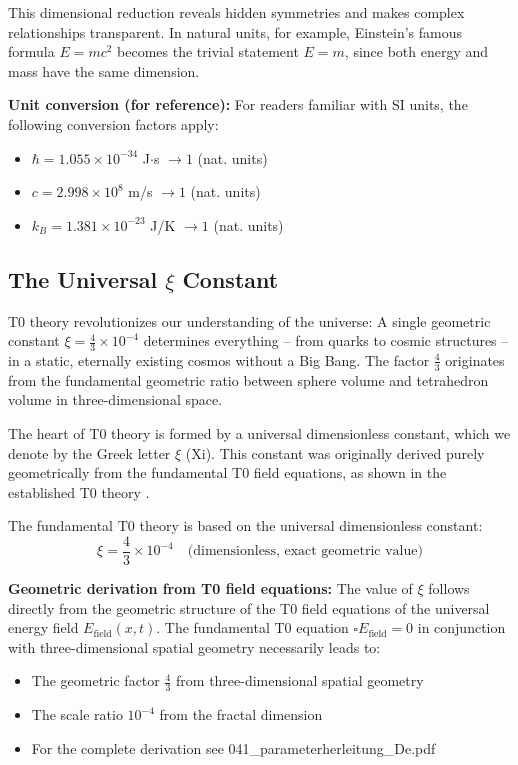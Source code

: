 	This dimensional reduction reveals hidden symmetries and makes complex relationships transparent. In natural units, for example, Einstein's famous formula $E = mc^2$ becomes the trivial statement $E = m$, since both energy and mass have the same dimension.
	
	\textbf{Unit conversion (for reference):}
	For readers familiar with SI units, the following conversion factors apply:
	\begin{itemize}
		\item $\hbar = 1.055 \times 10^{-34}$ J$\cdot$s $\rightarrow 1$ (nat. units)
		\item $c = 2.998 \times 10^8$ m/s $\rightarrow 1$ (nat. units)  
		\item $k_B = 1.381 \times 10^{-23}$ J/K $\rightarrow 1$ (nat. units)
	\end{itemize}
	
	\subsection{The Universal $\xi$ Constant}
	
	\begin{revolutionary}
		T0 theory revolutionizes our understanding of the universe: A single geometric constant $\xi = \frac{4}{3} \times 10^{-4}$ determines everything -- from quarks to cosmic structures -- in a static, eternally existing cosmos without a Big Bang. The factor $\frac{4}{3}$ originates from the fundamental geometric ratio between sphere volume and tetrahedron volume in three-dimensional space.
	\end{revolutionary}
	
	The heart of T0 theory is formed by a universal dimensionless constant, which we denote by the Greek letter $\xi$ (Xi). This constant was originally derived purely geometrically from the fundamental T0 field equations, as shown in the established T0 theory \cite{T0Theory}.
	
	The fundamental T0 theory is based on the universal dimensionless constant:
	\begin{equation}
		\xi = \frac{4}{3} \times 10^{-4} \quad \text{(dimensionless, exact geometric value)}
	\end{equation}
	
	\textbf{Geometric derivation from T0 field equations:} The value of $\xi$ follows directly from the geometric structure of the T0 field equations of the universal energy field $E_{\text{field}}(x,t)$. The fundamental T0 equation $\square E_{\text{field}} = 0$ in conjunction with three-dimensional spatial geometry necessarily leads to:
\begin{itemize}
	\item The geometric factor $\frac{4}{3}$ from three-dimensional spatial geometry
	\item The scale ratio $10^{-4}$ from the fractal dimension
	\item For the complete derivation see 041\_parameterherleitung\_De.pdf 
\end{itemize}
	
